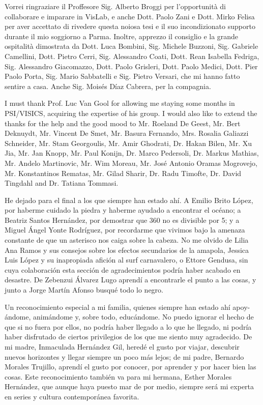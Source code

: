 Vorrei ringraziare il Proffesore Sig. Alberto Broggi per l'opportunità di collaborare e imparare in VisLab, e anche Dott. Paolo Zani e Dott. Mirko Felisa per aver accettato di rivedere questa noiosa tesi e il suo incondizionato supporto durante il mio soggiorno a Parma. Inoltre, apprezzo il consiglio e la grande ospitalità dimostrata da Dott. Luca Bombini, Sig. Michele Buzzoni, Sig. Gabriele Camellini, Dott. Pietro Cerri, Sig. Alessandro Coati, Dott. Rean Isabella Fedriga, Sig. Alessandro Giacomazzo, Dott. Paolo Grisleri, Dott. Paolo Medici, Dott. Pier Paolo Porta, Sig. Mario Sabbatelli e Sig. Pietro Versari, che mi hanno fatto sentire a casa. Anche Sig. Moisés Díaz Cabrera, per la compagnia.

I must thank Prof. Luc Van Gool for allowing me staying some months in PSI/VISICS, acquiring the expertise of his group. I would also like to extend the thanks for the help and the good mood to Mr. Roeland De Geest, Mr. Bert Deknuydt, Mr. Vincent De Smet, Mr. Basura Fernando, Mrs. Rosalia Galiazzi Schneider, Mr. Stam Georgoulis, Mr. Amir Ghodrati, Dr. Hakan Bilen, Mr. Xu Jia, Mr. Jan Knopp, Mr. Paul Konijn, Dr. Marco Pedersoli, Dr. Markus Mathias, Mr. Andelo Martinovic, Mr. Wim Moreau, Mr. José Antonio Oramas Mogrovejo, Mr. Konstantinos Rematas, Mr. Gilad Sharir, Dr. Radu Timofte, Dr. David Tingdahl and Dr. Tatiana Tommasi.

He dejado para el final a los que siempre han estado ahí. A Emilio Brito López, por haberme cuidado la piedra y haberme ayudado a encontrar el océano; a Beatriz Santos Hernández, por demostrar que 360 no es divisible por 5; y a Miguel Ángel Yonte Rodríguez, por recordarme que vivimos bajo la amenaza constante de que un asterisco nos caiga sobre la cabeza. No me olvido de Lilia Ana Ramos y sus consejos sobre los efectos secundarios de la amapola, Jessica Luis López y su inapropiada afición al surf carnavalero, o Ettore Gendusa, sin cuya colaboración esta sección de agradecimientos podría haber acabado en desastre. De Zebenzui Álvarez Lugo aprendí a encontrarle el punto a las cosas, y junto a Jorge Martín Afonso busqué todo lo negro.

Un reconocimiento especial a mi familia, quienes siempre han estado ahí apoy- ándome, animándome y, sobre todo, educándome. No puedo ignorar el hecho de que si no fuera por ellos, no podría haber llegado a lo que he llegado, ni podría haber disfrutado de ciertos privilegios de los que me siento muy agradecido. De mi madre, Inmaculada Hernández Gil, heredé el gusto por viajar, descubrir nuevos horizontes y llegar siempre un poco más lejos; de mi padre, Bernardo Morales Trujillo, aprendí el gusto por conocer, por aprender y por hacer bien las cosas. Este reconocimiento también va para mi hermana, Esther Morales Hernández, que aunque haya puesto mar de por medio, siempre será mi experta en series y cultura contemporánea favorita.

